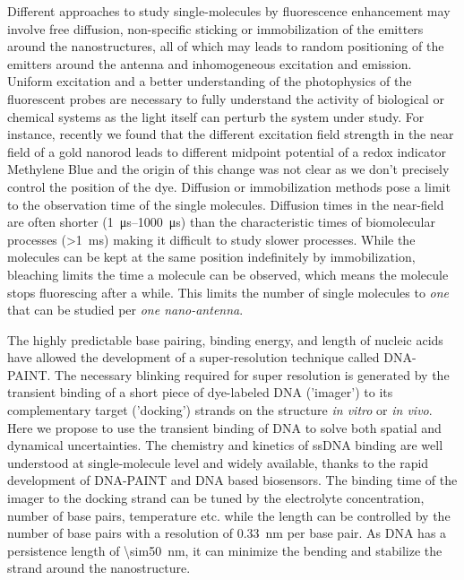 Different approaches to study single-molecules by fluorescence enhancement may involve free diffusion, non-specific sticking or immobilization of the emitters around the nanostructures, all of which may leads to random positioning of the emitters around the antenna and inhomogeneous excitation and emission.\cite{pradhan2016goldnanorodenhanced,yuan2013thousandfold,zhang2017gold}
Uniform excitation and a better understanding of the photophysics of the fluorescent probes are necessary to fully understand the activity of biological or chemical systems as the light itself can perturb the system under study.
For instance, recently we found that the different excitation field strength in the near field of a gold nanorod leads to different midpoint potential of a redox indicator Methylene Blue and the origin of this change was not clear as we don't precisely control the position of the dye.\cite{zhang2017gold}
Diffusion or immobilization methods pose a limit to the observation time of the single molecules.
Diffusion times in the near-field are often shorter (\SIrange{1}{1000}{\us}) than the characteristic times of biomolecular processes (\SI{>1}{\ms}) making it difficult to study slower processes.
While the molecules can be kept at the same position indefinitely by immobilization, bleaching limits the time a molecule can be observed, which means the molecule stops fluorescing after a while.
This limits the number of single molecules to \textit{one} that can be studied per \textit{one nano-antenna}.


The highly predictable base pairing, binding energy, and length of nucleic acids have allowed the development of a super-resolution technique called DNA-PAINT.\cite{jungmann2010singlemolecule,lin2012submicrometre,schnitzbauer2017superresolution}
The necessary blinking required for super resolution is generated by the transient binding of a short piece of dye-labeled DNA ('imager') to its complementary target ('docking') strands on the structure \textit{in vitro} or \textit{in vivo}.
Here we propose to use the transient binding of DNA to solve both spatial and dynamical uncertainties.
The chemistry and kinetics of ssDNA binding are well understood at single-molecule level and widely available, thanks to the rapid development of DNA-PAINT and DNA based biosensors.\cite{sassolas2008dna,jungmann2010singlemolecule}
The binding time of the imager to the docking strand can be tuned by the electrolyte concentration, number of base pairs, temperature etc. while the length can be controlled by the number of base pairs with a resolution of \SI{0.33}{\nm} per base pair.
As DNA has a persistence length of \SI{\sim50}{\nm}, it can minimize the bending and stabilize the strand around the nanostructure.\cite{manning2006the}


